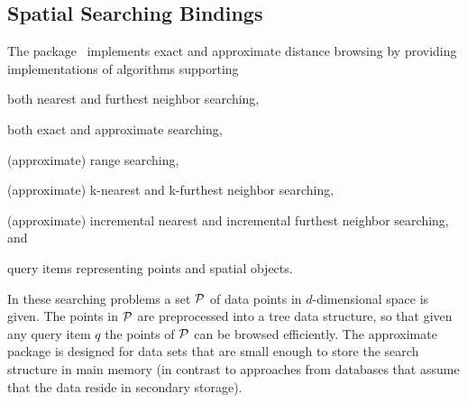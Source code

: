 \subsection{Spatial Searching Bindings}
\label{ssec:modules:ss}
The \dDSpatialSearchingPackage{} package~\cite{cgal:tf-ssd-21a}
implements exact and approximate distance browsing by providing
implementations of algorithms supporting
\begin{compactenum}
\item both nearest and furthest neighbor searching,
\item both exact and approximate searching,
\item (approximate) range searching,
\item (approximate) k-nearest and k-furthest neighbor searching,
\item (approximate) incremental nearest and incremental furthest neighbor searching, and
\item query items representing points and spatial objects.
\end{compactenum}
In these searching problems a set ${\cal P}$ of data points in
$d$-dimensional space is given. The points in ${\cal P}$ are preprocessed
into a tree data structure, so that given any query item $q$ the
points of ${\cal P}$ can be browsed efficiently. The approximate
\dDSpatialSearchingPackage{} package is designed for data sets that
are small enough to store the search structure in main memory (in
contrast to approaches from databases that assume that the data reside
in secondary storage).

\begin{table}[!htp]
  \caption{\dDSpatialSearchingPackage{} module flags}
  \centering{}
 \label{tab:ss}
\end{table}


